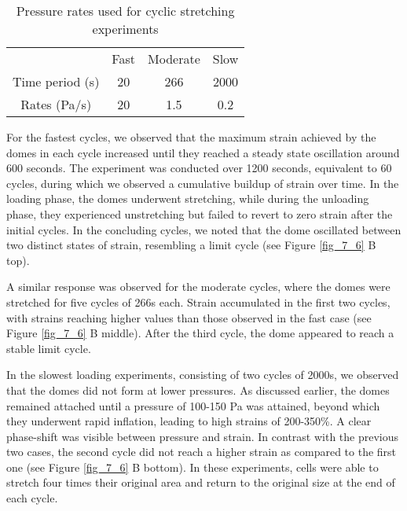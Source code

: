\begin{center}
	\begin{table}[h!]
		\label{tab:hysteresis}
		\centering
		\begin{tabular}{c c c c}
			& Fast & Moderate & Slow \\ 
			Time period (s) & 20   & 266      & 2000 \\ 
			Rates (Pa/s)    & 20   & 1.5      & 0.2  \\ 
		\end{tabular}
		\caption{Pressure rates used for cyclic stretching experiments}
	\end{table}
\end{center}

For the fastest cycles, we observed that the maximum strain achieved by the domes in each cycle increased until they reached a steady state oscillation around 600 seconds. 
The experiment was conducted over 1200 seconds, equivalent to 60 cycles, during which we observed a cumulative buildup of strain over time. In the loading phase, the domes underwent stretching, while during the unloading phase, they experienced unstretching but failed to revert to zero strain after the initial cycles. In the concluding cycles, we noted that the dome oscillated between two distinct states of strain, resembling a limit cycle (see Figure \ref{fig_7_6} B top).

A similar response was observed for the moderate cycles, where the domes were stretched for five cycles of 266s each. Strain accumulated in the first two cycles, with strains reaching higher values than those observed in the fast case (see Figure \ref{fig_7_6} B middle). After the third cycle, the dome appeared to reach a stable limit cycle.

In the slowest loading experiments, consisting of two cycles of 2000s, we observed that the domes did not form at lower pressures. As discussed earlier, the domes remained attached until a pressure of 100-150 Pa was attained, beyond which they underwent rapid inflation, leading to high strains of 200-350\%. A clear phase-shift was visible between pressure and strain. In contrast with the previous two cases, the second cycle did not reach a higher strain as compared to the first one (see Figure \ref{fig_7_6} B bottom). In these experiments, cells were able to stretch four times their original area and return to the original size at the end of each cycle.


